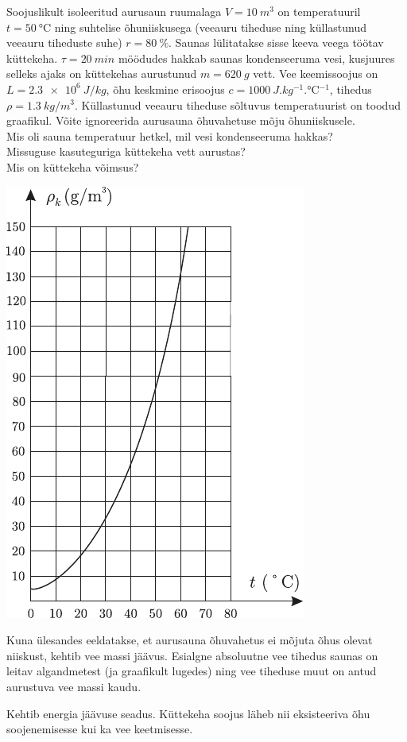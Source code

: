 
Soojuslikult isoleeritud aurusaun ruumalaga $V = \SI{10}{m^3}$ on temperatuuril $t = \SI{50}{\degreeCelsius}$ ning suhtelise õhuniiskusega (veeauru tiheduse ning küllastunud veeauru tiheduste suhe) $r = \SI{80}{\%}$. Saunas lülitatakse sisse keeva veega töötav küttekeha. $\tau = \SI{20}{min}$ möödudes hakkab saunas kondenseeruma vesi, kusjuures selleks ajaks on küttekehas aurustunud $m = \SI{620}{g}$ vett. Vee keemissoojus on $L = \SI{2.3e6}{J/kg}$, õhu keskmine erisoojus $c=\SI{1000}{J.kg^{-1}.\degreeCelsius^{-1}}$, tihedus $\rho = \SI{1.3}{kg/m^3}$. Küllastunud veeauru tiheduse sõltuvus temperatuurist on toodud graafikul. Võite ignoreerida aurusauna õhuvahetuse mõju õhuniiskusele.\\
\osa Mis oli sauna temperatuur hetkel, mil vesi kondenseeruma hakkas?\\
\osa Missuguse kasuteguriga küttekeha vett aurustas?\\
\osa Mis on küttekeha võimsus?
\begin{center}
	\includegraphics[width=0.5\linewidth]{2004-lahg-06-yl.pdf}
\end{center}

\hint
\osa Kuna ülesandes eeldatakse, et aurusauna õhuvahetus ei mõjuta õhus olevat niiskust, kehtib vee massi jäävus. Esialgne absoluutne vee tihedus saunas on leitav algandmetest (ja graafikult lugedes) ning vee tiheduse muut on antud aurustuva vee massi kaudu.

\osa\osa Kehtib energia jäävuse seadus. Küttekeha soojus läheb nii eksisteeriva õhu soojenemisesse kui ka vee keetmisesse.

